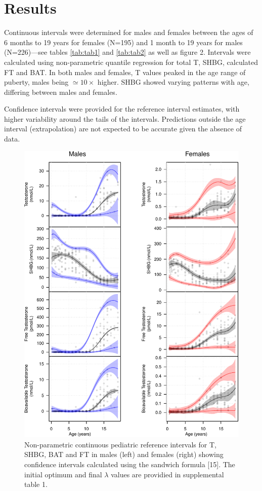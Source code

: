 \documentclass[]{elsarticle} %
\begin{document}
\hypertarget{results}{%
\section{Results}\label{results}}

Continuous intervals were determined for males and females between the
ages of 6 months to 19 years for females (N=195) and 1 month to 19 years
for males (N=226)---see tables \ref{tab:tab1} and \ref{tab:tab2} as well
as figure 2. Intervals were calculated using non-parametric quantile
regression for total T, SHBG, calculated FT and BAT. In both males and
females, T values peaked in the age range of puberty, males being
\(\simeq 10 \times\) higher. SHBG showed varying patterns with age,
differing between males and females.

Confidence intervals were provided for the reference interval estimates,
with higher variability around the tails of the intervals. Predictions
outside the age interval (extrapolation) are not expected to be accurate
given the absence of data.

\begin{figure}[H]
\includegraphics{quantregfitsfig2-1} \caption{\label{fig:fig2}Non-parametric continuous pediatric reference intervals for T, SHBG, BAT and FT in males (left) and females (right) showing confidence intervals calculated using the sandwich formula [15]. The initial optimum and final $\lambda$ values are providied in supplemental table 1.}\label{fig:quantregfitsfig2}
\end{figure}
\end{document}
